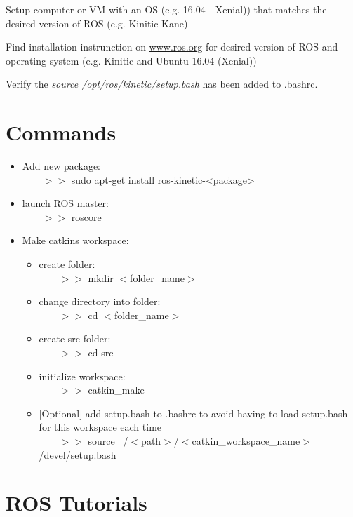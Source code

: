 \documentclass{scrartcl}
\begin{document}
Setup computer or VM with an OS (e.g. 16.04 - Xenial)) that matches the desired version of ROS (e.g. Kinitic Kane)

Find installation instrunction on \href{http://www.ros.org/about-ros/}{www.ros.org} for desired version of ROS and operating system (e.g. Kinitic and Ubuntu 16.04 (Xenial)) 

Verify the \textit{source /opt/ros/kinetic/setup.bash} has been added to .bashrc.

\section {Commands}

\begin{itemize}
	\item Add new package: 
		\\ $\qquad >>$  sudo apt-get install ros-kinetic-<package>

	\item launch ROS master: 
		\\ $\qquad >>$  roscore

	\item Make catkins workspace: 
	\begin{itemize}
		\item create folder: 
			\\ $\qquad >>$ mkdir $<$folder\_name$>$
		\item change directory into folder: 
			\\ $\qquad >>$ cd $<$folder\_name$>$		
		\item create src folder: 
			\\ $\qquad >>$ cd src		
		\item initialize workspace: 
			\\ $\qquad >>$ catkin\_make		
		\item $[$Optional$]$ add setup.bash to .bashrc to avoid having to load setup.bash for this workspace each time
		\\ $\qquad >>$ source ~/$<$path$>$/$<$catkin\_workspace\_name$>$/devel/setup.bash	
			
	\end{itemize}

\end{itemize} 

\section{ROS Tutorials}
\label{sec:install_ros}
\end{document}
